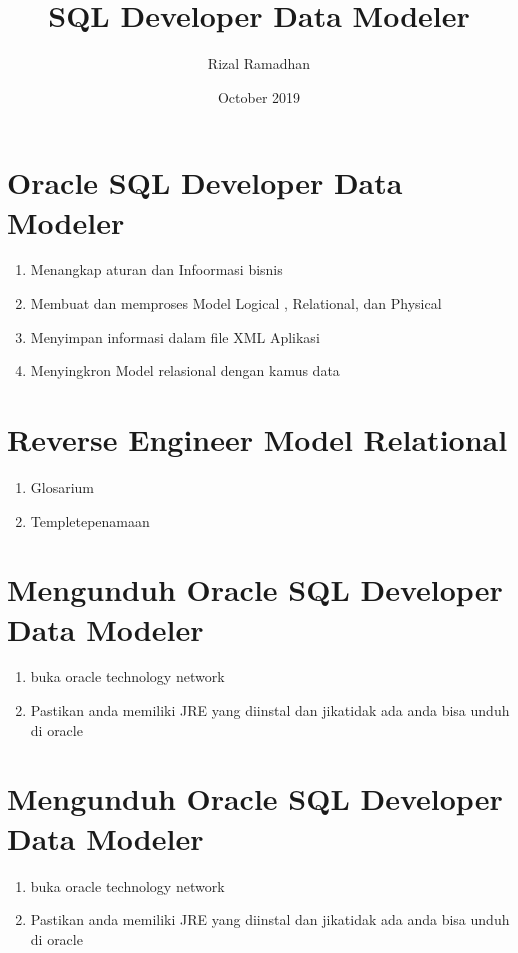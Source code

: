 \documentclass{article}
\title{SQL Developer Data Modeler }
\author{Rizal Ramadhan}
\date{October 2019}
\begin{document}
\maketitle

\section{Oracle SQL Developer Data Modeler }
\begin{enumerate}

\item 	Menangkap aturan dan Infoormasi bisnis
\item	Membuat dan memproses Model Logical , Relational, dan Physical
\item 	Menyimpan informasi dalam file XML Aplikasi
\item   	Menyingkron Model relasional dengan kamus data


\end{enumerate}

\section{Reverse Engineer Model Relational  }
\begin{enumerate}

\item 	Glosarium
\item	Templetepenamaan

\end{enumerate}

\section{Mengunduh Oracle SQL Developer Data Modeler }
\begin{enumerate}

\item   buka oracle technology network 
\item	Pastikan anda memiliki JRE yang diinstal dan jikatidak ada anda bisa unduh di oracle

\end{enumerate}

\section{Mengunduh Oracle SQL Developer Data Modeler }
\begin{enumerate}

\item   buka oracle technology network 
\item	Pastikan anda memiliki JRE yang diinstal dan jikatidak ada anda bisa unduh di oracle

\end{enumerate}
\end{document}
